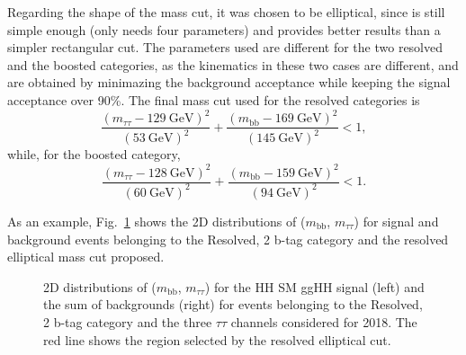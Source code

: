 \documentclass[../main.tex]{subfiles}
\begin{document}
Regarding the shape of the mass cut, it was chosen to be elliptical, since is still simple enough (only needs four parameters) and provides better results than a simpler rectangular cut. The parameters used are different for the two resolved and the boosted categories, as the kinematics in these two cases are different, and are obtained by minimazing the background acceptance while keeping the signal acceptance over 90\%. The final mass cut used for the resolved categories is
\begin{equation}
\frac{\left(m_{\tau\tau} - 129 ~\text{GeV}\right)^2}{(53~\text{GeV})^2} + \frac{\left(m_{\text{bb}} - 169 ~\text{GeV}\right)^2}{(145~\text{GeV})^2} < 1,
\end{equation}
while, for the boosted category,
\begin{equation}
\frac{\left(m_{\tau\tau} - 128 ~\text{GeV}\right)^2}{(60~\text{GeV})^2} + \frac{\left(m_{\text{bb}} - 159 ~\text{GeV}\right)^2}{(94~\text{GeV})^2} < 1.
\end{equation}

As an example, Fig.~\ref{hh:fig:mass_cut} shows the 2D distributions of ($m_\text{bb}$, $m_{\tau\tau}$) for signal and background events belonging to the Resolved, 2 b-tag category and the resolved elliptical mass cut proposed. 

\begin{figure}[h!]
\begin{center}
\end{center}
\caption{2D distributions of ($m_\text{bb}$, $m_{\tau\tau}$) for the HH SM ggHH signal (left) and the sum of backgrounds (right) for events belonging to the Resolved, 2 b-tag category and the three $\tau\tau$ channels considered for 2018. The red line shows the region selected by the resolved elliptical cut.}
\label{hh:fig:mass_cut}
\end{figure}
\end{document}
